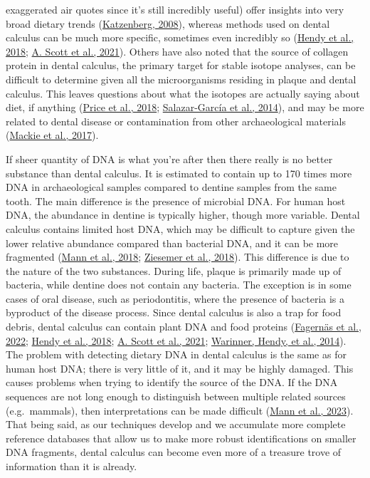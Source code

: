 \documentclass[
  letterpaper,
]{book}
\begin{document}
exaggerated air quotes since it's still incredibly useful) offer
insights into very broad dietary trends
(\protect\hyperlink{ref-katzenbergStableIsotope2008}{Katzenberg, 2008}),
whereas methods used on dental calculus can be much more specific,
sometimes even incredibly so
(\protect\hyperlink{ref-hendyProteomicCalculus2018}{Hendy et al., 2018};
\protect\hyperlink{ref-scottExoticFoods2021}{A. Scott et al., 2021}).
Others have also noted that the source of collagen protein in dental
calculus, the primary target for stable isotope analyses, can be
difficult to determine given all the microorganisms residing in plaque
and dental calculus. This leaves questions about what the isotopes are
actually saying about diet, if anything
(\protect\hyperlink{ref-priceTestingValidity2018}{Price et al., 2018};
\protect\hyperlink{ref-salazar-garciaDentalCalculus2014}{Salazar-García
et al., 2014}), and may be more related to dental disease or
contamination from other archaeological materials
(\protect\hyperlink{ref-mackiePreservationMetaproteome2017}{Mackie et
al., 2017}).

If sheer quantity of DNA is what you're after then there really is no
better substance than dental calculus. It is estimated to contain up to
170 times more DNA in archaeological samples compared to dentine samples
from the same tooth. The main difference is the presence of microbial
DNA. For human host DNA, the abundance in dentine is typically higher,
though more variable. Dental calculus contains limited host DNA, which
may be difficult to capture given the lower relative abundance compared
than bacterial DNA, and it can be more fragmented
(\protect\hyperlink{ref-mannDifferentialPreservation2018}{Mann et al.,
2018}; \protect\hyperlink{ref-ziesemerGenomeCalculus2018}{Ziesemer et
al., 2018}). This difference is due to the nature of the two substances.
During life, plaque is primarily made up of bacteria, while dentine does
not contain any bacteria. The exception is in some cases of oral
disease, such as periodontitis, where the presence of bacteria is a
byproduct of the disease process. Since dental calculus is also a trap
for food debris, dental calculus can contain plant DNA and food proteins
(\protect\hyperlink{ref-fagernasMicrobialBiogeography2022}{Fagernäs et
al., 2022}; \protect\hyperlink{ref-hendyProteomicCalculus2018}{Hendy et
al., 2018}; \protect\hyperlink{ref-scottExoticFoods2021}{A. Scott et
al., 2021}; \protect\hyperlink{ref-warinnerEvidenceMilk2014}{Warinner,
Hendy, et al., 2014}). The problem with detecting dietary DNA in dental
calculus is the same as for human host DNA; there is very little of it,
and it may be highly damaged. This causes problems when trying to
identify the source of the DNA. If the DNA sequences are not long enough
to distinguish between multiple related sources (e.g.~mammals), then
interpretations can be made difficult
(\protect\hyperlink{ref-mannHaveSomething2023}{Mann et al., 2023}). That
being said, as our techniques develop and we accumulate more complete
reference databases that allow us to make more robust identifications on
smaller DNA fragments, dental calculus can become even more of a
treasure trove of information than it is already.
\end{document}
